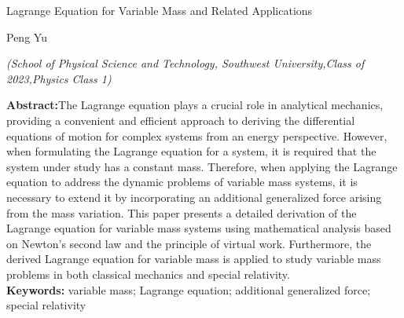 \documentclass[12pt,twoside]{article}
\numberwithin{equation}{section}    %
\begin{document}
\newpage

\begin{center}
    \heiti{}
    Lagrange Equation for Variable Mass and Related Applications
\end{center}

\begin{center}
    Peng Yu

    \textit{(School of Physical Science and Technology, Southwest University,Class of 2023,Physics Class 1)}
\end{center}

\begin{flushleft}                   %
    \justifying                     %
    \textbf{Abstract:}The Lagrange equation plays a crucial role in analytical mechanics, providing a convenient and efficient approach to deriving the differential equations of motion for complex systems from an energy perspective. However, when formulating the Lagrange equation for a system, it is required that the system under study has a constant mass. Therefore, when applying the Lagrange equation to address the dynamic problems of variable mass systems, it is necessary to extend it by incorporating an additional generalized force arising from the mass variation. This paper presents a detailed derivation of the Lagrange equation for variable mass systems using mathematical analysis based on Newton's second law and the principle of virtual work. Furthermore, the derived Lagrange equation for variable mass is applied to study variable mass problems in both classical mechanics and special relativity.\\
    \textbf{Keywords: }variable mass; Lagrange equation; additional generalized force; special relativity
\end{flushleft}
\end{document}
